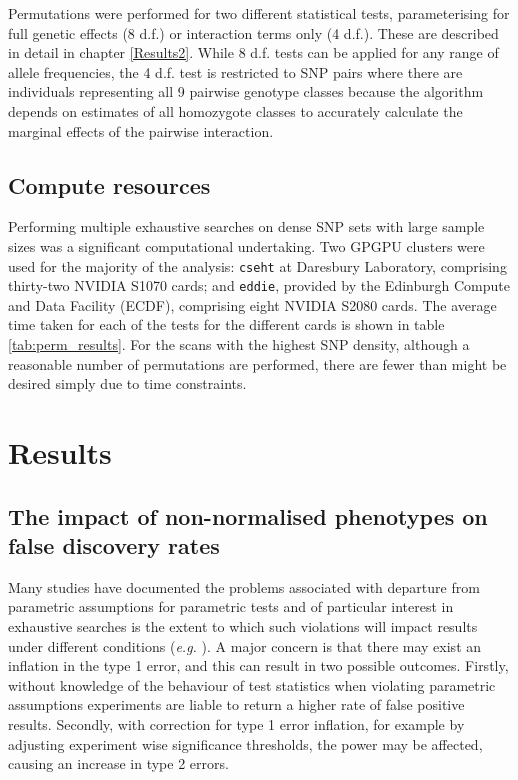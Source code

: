 Permutations were performed for two different statistical tests, parameterising for full genetic effects (8 d.f.) or interaction terms only (4 d.f.). These are described in detail in chapter \ref{Results2}. While 8 d.f. tests can be applied for any range of allele frequencies, the 4 d.f. test is restricted to SNP pairs where there are individuals representing all 9 pairwise genotype classes because the algorithm depends on estimates of all homozygote classes to accurately calculate the marginal effects of the pairwise interaction.


\subsection{Compute resources}

Performing multiple exhaustive searches on dense SNP sets with large sample sizes was a significant computational undertaking. Two GPGPU clusters were used for the majority of the analysis: {\tt cseht} at Daresbury Laboratory, comprising thirty-two NVIDIA S1070 cards; and {\tt eddie}, provided by the Edinburgh Compute and Data Facility (ECDF), comprising eight NVIDIA S2080 cards. The average time taken for each of the tests for the different cards is shown in table \ref{tab:perm_results}. For the scans with the highest SNP density, although a reasonable number of permutations are performed, there are fewer than might be desired simply due to time constraints.


\section{Results}

\subsection{The impact of non-normalised phenotypes on false discovery rates}

Many studies have documented the problems associated with departure from parametric assumptions for parametric tests and of particular interest in exhaustive searches is the extent to which such violations will impact results under different conditions (\emph{e.g.} \cite{Boneau1960, Sawilowsky1992, Cribbie2003}). A major concern is that there may exist an inflation in the type 1 error, and this can result in two possible outcomes. Firstly, without knowledge of the behaviour of test statistics when violating parametric assumptions experiments are liable to return a higher rate of false positive results. Secondly, with correction for type 1 error inflation, for example by adjusting experiment wise significance thresholds, the power may be affected, causing an increase in type 2 errors.

